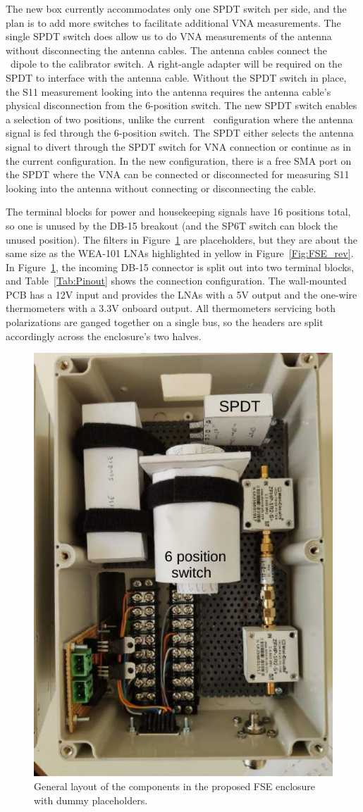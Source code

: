 The new box currently accommodates only one SPDT switch per side, and the plan is to add more switches to facilitate additional VNA measurements. The single SPDT switch does allow us to do VNA measurements of the antenna without disconnecting the antenna cables. The antenna cables connect the \prizm\ dipole to the calibrator switch. A right-angle adapter will be required on the SPDT to interface with the antenna cable. Without the SPDT switch in place, the S11 measurement looking into the antenna requires the antenna cable's physical disconnection from the 6-position switch. The new SPDT switch enables a selection of two positions, unlike the current \prizm\ configuration where the antenna signal is fed through the 6-position switch. The SPDT either selects the antenna signal to divert through the SPDT switch for VNA connection or continue as in the current configuration. In the new configuration, there is a free SMA port on the SPDT where the VNA can be connected or disconnected for measuring S11 looking into the antenna without connecting or disconnecting the cable. 

The terminal blocks for power and housekeeping signals have 16 positions total, so one is unused by the DB-15 breakout (and the SP6T switch can block the unused position). The filters in Figure~\ref{Fig:FSE_archi} are placeholders, but they are about the same size as the WEA-101 LNAs highlighted in yellow in Figure~\ref{Fig:FSE_rev}. In Figure~\ref{Fig:FSE_archi}, the incoming DB-15 connector is split out into two terminal blocks, and Table~\ref{Tab:Pinout} shows the connection configuration. The wall-mounted PCB has a 12V input and provides the LNAs with a 5V output and the one-wire thermometers with a 3.3V onboard output. All thermometers servicing both polarizations are ganged together on a single bus, so the headers are split accordingly across the enclosure's two halves.

\begin{figure}
	\centering
	\includegraphics[width=0.5\linewidth]{Figures/FSE_archi}
	\caption{General layout of the components in the proposed FSE enclosure with dummy placeholders.}
	\label{Fig:FSE_archi}
\end{figure}


